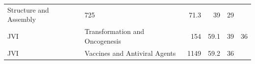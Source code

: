 \documentclass[11pt,]{article}
\begin{document}
\begin{longtable}[]{@{}llrrrr@{}}
\begin{minipage}[t]{0.43\columnwidth}
Structure and Assembly\strut
\end{minipage} & \begin{minipage}[t]{0.04\columnwidth}\raggedleft\strut
725\strut
\end{minipage} & \begin{minipage}[t]{0.08\columnwidth}\raggedleft\strut
71.3\strut
\end{minipage} & \begin{minipage}[t]{0.11\columnwidth}\raggedleft\strut
39\strut
\end{minipage} & \begin{minipage}[t]{0.11\columnwidth}\raggedleft\strut
29\strut
\end{minipage}\tabularnewline
\begin{minipage}[t]{0.06\columnwidth}\raggedright\strut
JVI\strut
\end{minipage} & \begin{minipage}[t]{0.43\columnwidth}\raggedright\strut
Transformation and Oncogenesis\strut
\end{minipage} & \begin{minipage}[t]{0.04\columnwidth}\raggedleft\strut
154\strut
\end{minipage} & \begin{minipage}[t]{0.08\columnwidth}\raggedleft\strut
59.1\strut
\end{minipage} & \begin{minipage}[t]{0.11\columnwidth}\raggedleft\strut
39\strut
\end{minipage} & \begin{minipage}[t]{0.11\columnwidth}\raggedleft\strut
36\strut
\end{minipage}\tabularnewline
\begin{minipage}[t]{0.06\columnwidth}\raggedright\strut
JVI\strut
\end{minipage} & \begin{minipage}[t]{0.43\columnwidth}\raggedright\strut
Vaccines and Antiviral Agents\strut
\end{minipage} & \begin{minipage}[t]{0.04\columnwidth}\raggedleft\strut
1149\strut
\end{minipage} & \begin{minipage}[t]{0.08\columnwidth}\raggedleft\strut
59.2\strut
\end{minipage} & \begin{minipage}[t]{0.11\columnwidth}\raggedleft\strut
36\strut
\end{minipage} & \begin{minipage}[t]{0.11\columnwidth}\raggedleft\strut

\end{minipage}
\end{longtable}
\end{document}
